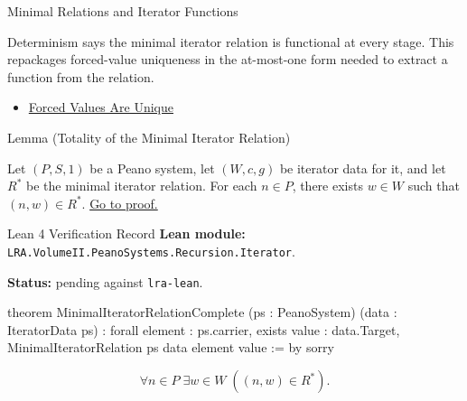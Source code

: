 \begin{topicbox}{Minimal Relations and Iterator Functions}
\begin{remark*}[Interpretation]
Determinism says the minimal iterator relation is functional at every stage.
This repackages forced-value uniqueness in the at-most-one form needed to
extract a function from the relation.
\end{remark*}

\begin{dependencies}
\begin{itemize}
  \item \hyperref[lem:forced-values-are-unique]{Forced Values Are Unique}
\end{itemize}
\end{dependencies}

\begin{lemmabox}{Lemma (Totality of the Minimal Iterator Relation)}
\begin{lemma}
\label{lem:minimal-iterator-relation-complete}
Let $(P,S,1)$ be a Peano system, let $(W,c,g)$ be iterator data for it, and let
$R^*$ be the minimal iterator relation. For each $n\in P$, there exists
$w\in W$ such that $(n,w)\in R^*$.
\hyperref[prf:minimal-iterator-relation-complete]{Go to proof.}
\end{lemma}
\end{lemmabox}

\begin{formalizationrecord}{Lean 4 Verification Record}
\textbf{Lean module:} \texttt{LRA.VolumeII.PeanoSystems.Recursion.Iterator}.\par
{}
\textbf{Status:} pending against \texttt{lra-lean}.\par

\begin{leancode}
theorem MinimalIteratorRelationComplete
    (ps : PeanoSystem)
    (data : IteratorData ps) :
    forall element : ps.carrier,
      exists value : data.Target,
        MinimalIteratorRelation ps data element value := by
  sorry
\end{leancode}
\end{formalizationrecord}

\begin{remark*}
\[
\forall n\in P\;\exists w\in W\;((n,w)\in R^*).
\]
\end{remark*}


\end{topicbox}
